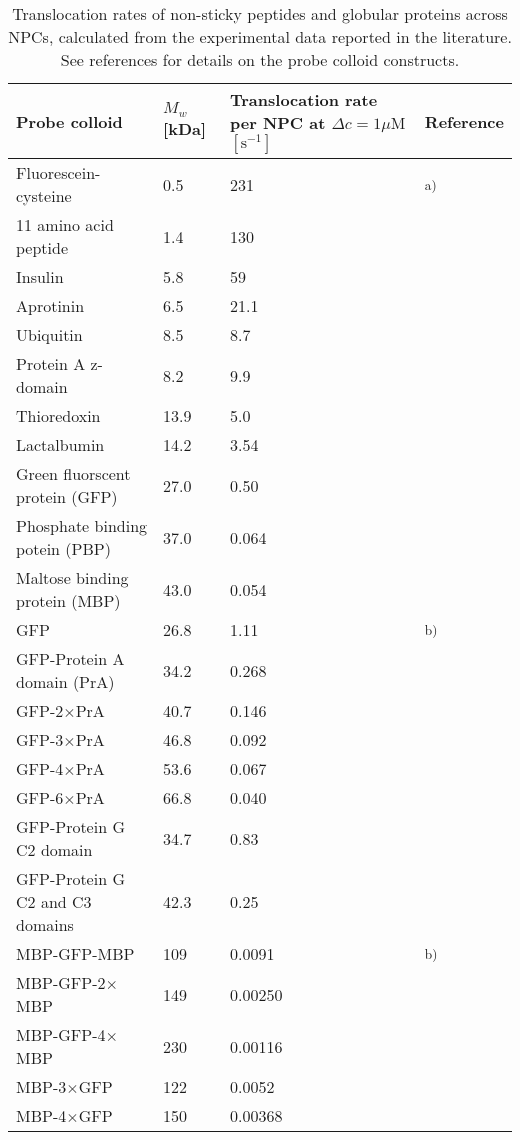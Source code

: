 \documentclass[10pt, a4paper, twocolumn]{article}
\begin{document}
\begin{table*}[h]
\begin{minipage}{\linewidth}
\centering
\caption{Translocation rates of non-sticky peptides and globular proteins across NPCs, calculated from the experimental data reported in the literature.
See references for details on the probe colloid constructs.}
\label{tbl:inert_probes}
\begin{tabular}{p{6cm}|p{2cm}|p{3.7cm}|p{2cm}}
Probe colloid & $M_w$ [kDa] & Translocation rate per NPC at $\Delta c = 1\mu\text{M}$ $[\text{s}^{-1}]$ & Reference \\
\hline
Fluorescein-cysteine & 0.5 & 231 & \cite{Mohr2009} \textsuperscript{a)} \\
11 amino acid peptide & 1.4 & 130 &  \\
Insulin & 5.8 & 59 &  \\
Aprotinin & 6.5 & 21.1 &  \\
Ubiquitin & 8.5 & 8.7 &  \\
Protein A z-domain & 8.2 & 9.9 &  \\
Thioredoxin & 13.9 & 5.0 &  \\
Lactalbumin & 14.2 & 3.54 &  \\
Green fluorscent protein (GFP) & 27.0 & 0.50 &  \\
Phosphate binding potein (PBP) & 37.0 & 0.064 &  \\
Maltose binding protein (MBP) & 43.0 & 0.054 &  \\
\hline
GFP & 26.8 & 1.11 & \cite{Timney2016} \textsuperscript{b)} \\
GFP-Protein A domain (PrA) & 34.2 & 0.268 &  \\
GFP-2$\times$PrA & 40.7 & 0.146 &  \\
GFP-3$\times$PrA & 46.8 & 0.092 &  \\
GFP-4$\times$PrA & 53.6 & 0.067 &  \\
GFP-6$\times$PrA & 66.8 & 0.040 &  \\
GFP-Protein G C2 domain & 34.7 & 0.83 &  \\
GFP-Protein G C2 and C3 domains & 42.3 & 0.25 &  \\
\hline
MBP-GFP-MBP & 109 & 0.0091 & \cite{Popken2015} \textsuperscript{b)} \\
MBP-GFP-2$\times$MBP & 149 & 0.00250 &  \\
MBP-GFP-4$\times$MBP & 230 & 0.00116 &  \\
MBP-3$\times$GFP & 122 & 0.0052 &  \\
MBP-4$\times$GFP & 150 & 0.00368 &  \\

\end{tabular}
\end{minipage}
\end{table*}
\end{document}
